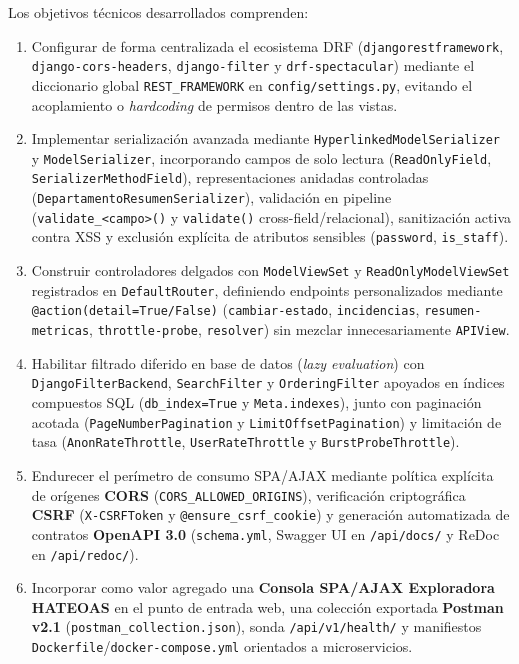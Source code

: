 \documentclass[10pt,a4paper]{article}
\begin{document}
Los objetivos técnicos desarrollados comprenden:
\begin{enumerate}
    \item Configurar de forma centralizada el ecosistema DRF (\texttt{djangorestframework}, \texttt{django-cors-headers}, \texttt{django-filter} y \texttt{drf-spectacular}) mediante el diccionario global \texttt{REST\_FRAMEWORK} en \texttt{config/settings.py}, evitando el acoplamiento o \textit{hardcoding} de permisos dentro de las vistas.
    \item Implementar serialización avanzada mediante \texttt{HyperlinkedModelSerializer} y \texttt{ModelSerializer}, incorporando campos de solo lectura (\texttt{ReadOnlyField}, \texttt{SerializerMethodField}), representaciones anidadas controladas (\texttt{DepartamentoResumenSerializer}), validación en pipeline (\texttt{validate\_<campo>()} y \texttt{validate()} cross-field/relacional), sanitización activa contra XSS y exclusión explícita de atributos sensibles (\texttt{password}, \texttt{is\_staff}).
    \item Construir controladores delgados con \texttt{ModelViewSet} y \texttt{ReadOnlyModelViewSet} registrados en \texttt{DefaultRouter}, definiendo endpoints personalizados mediante \texttt{@action(detail=True/False)} (\texttt{cambiar-estado}, \texttt{incidencias}, \texttt{resumen-metricas}, \texttt{throttle-probe}, \texttt{resolver}) sin mezclar innecesariamente \texttt{APIView}.
    \item Habilitar filtrado diferido en base de datos (\textit{lazy evaluation}) con \texttt{DjangoFilterBackend}, \texttt{SearchFilter} y \texttt{OrderingFilter} apoyados en índices compuestos SQL (\texttt{db\_index=True} y \texttt{Meta.indexes}), junto con paginación acotada (\texttt{PageNumberPagination} y \texttt{LimitOffsetPagination}) y limitación de tasa (\texttt{AnonRateThrottle}, \texttt{UserRateThrottle} y \texttt{BurstProbeThrottle}).
    \item Endurecer el perímetro de consumo SPA/AJAX mediante política explícita de orígenes \textbf{CORS} (\texttt{CORS\_ALLOWED\_ORIGINS}), verificación criptográfica \textbf{CSRF} (\texttt{X-CSRFToken} y \texttt{@ensure\_csrf\_cookie}) y generación automatizada de contratos \textbf{OpenAPI 3.0} (\texttt{schema.yml}, Swagger UI en \texttt{/api/docs/} y ReDoc en \texttt{/api/redoc/}).
    \item Incorporar como valor agregado una \textbf{Consola SPA/AJAX Exploradora HATEOAS} en el punto de entrada web, una colección exportada \textbf{Postman v2.1} (\texttt{postman\_collection.json}), sonda \texttt{/api/v1/health/} y manifiestos \texttt{Dockerfile}/\texttt{docker-compose.yml} orientados a microservicios.
\end{enumerate}
\end{document}
